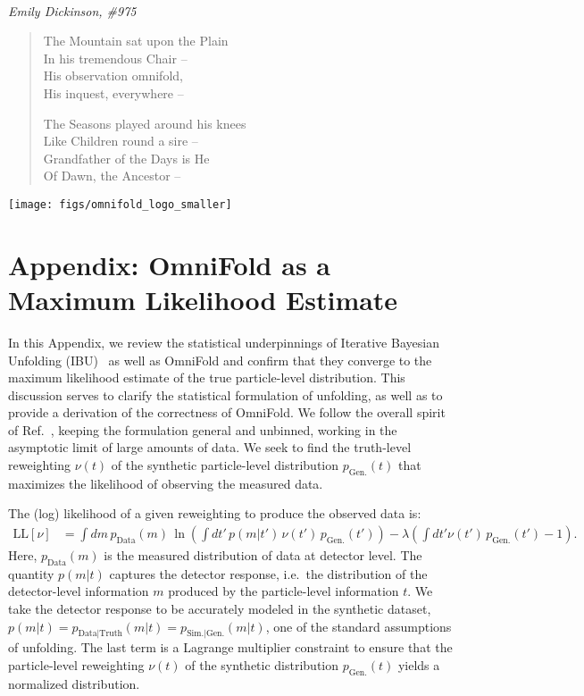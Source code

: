 \documentclass[prl,twocolumn,superscriptaddress,longbibliography,preprintnumbers,nofootinbib]{revtex4-1}
\DeclareRobustCommand{\Ref}[1]{Ref.~\cite{#1}}
\newcommand{\OmniFold}{{\sc OmniFold}\xspace}
\begin{document}
\appendix

~\\

\emph{Emily Dickinson, \#975}

\begin{quote}
The Mountain sat upon the Plain \\
In his tremendous Chair --\\
His observation omnifold,\\
His inquest, everywhere --

The Seasons played around his knees\\
Like Children round a sire --\\
Grandfather of the Days is He\\
Of Dawn, the Ancestor --
\end{quote}
\hfill  \texttt{[image: figs/omnifold\_logo\_smaller]}


\onecolumngrid


\section{Appendix: \OmniFold as a Maximum Likelihood Estimate}


In this Appendix, we review the statistical underpinnings of Iterative Bayesian Unfolding (IBU)~\cite{DAgostini:1994fjx} as well as \OmniFold and confirm that they converge to the maximum likelihood estimate of the true particle-level distribution.
%
This discussion serves to clarify the statistical formulation of unfolding, as well as to provide a derivation of the correctness of \OmniFold.
%
We follow the overall spirit of \Ref{shepp1982maximum}, keeping the formulation general and unbinned, working in the asymptotic limit of large amounts of data.
%
We seek to find the truth-level reweighting $\nu(t)$ of the synthetic particle-level distribution $p_\text{Gen.}(t)$ that maximizes the likelihood of observing the measured data.


The (log) likelihood of a given reweighting to produce the observed data is:
\begin{align}\label{eq:LL}
\text{LL}[\nu] & = \int dm\, p_\text{Data}(m)\,\ln\left(\int dt'\, p(m|t') \, \nu(t') \, p_\text{Gen.}(t') \right) - \lambda \left(\int dt'  \nu(t') \, p_\text{Gen.}(t') - 1\right).
\end{align}
%
Here, $p_\text{Data}(m)$ is the measured distribution of data at detector level.
%
The quantity $p(m|t)$ captures the detector response, i.e.\ the distribution of the detector-level information $m$ produced by the particle-level information $t$.
%
We take the detector response to be accurately modeled in the synthetic dataset, $p(m|t) = p_\text{Data$|$Truth}(m|t) = p_\text{Sim.$|$Gen.}(m|t)$, one of the standard assumptions of unfolding.
%
The last term is a Lagrange multiplier constraint to ensure that the particle-level reweighting $\nu(t)$ of the synthetic distribution $p_\text{Gen.}(t)$ yields a normalized distribution.
\end{document}
